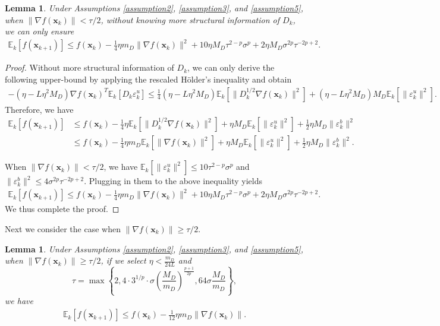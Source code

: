 \documentclass{article}
\newcommand{\bx}{\boldsymbol{x}}
\theoremstyle{plain}
\newtheorem{lemma}[theorem]{Lemma}
\theoremstyle{definition}
\theoremstyle{remark}
\begin{document}
\begin{lemma}
     Under Assumptions \ref{assumption2}, \ref{assumption3}, and \ref{assumption5}, when $\|\nabla f(\bx_k)\|<\tau/2$, without knowing more structural information of $D_k$, we can only ensure
    \begin{align*}
    \mathbb{E}_k[ f(\bx_{k+1}) ] \le f(\bx_k) - \frac{1}{4} \eta m_D \|\nabla f(\bx_k)\|^2 + 10 \eta M_D \tau^{2-p}\sigma^p + 2\eta M_D \sigma^{2p}\tau^{-2p+2}.
\end{align*}
\end{lemma}

\begin{proof}
    
Without more structural information of $D_k$, we can only derive the following upper-bound by applying the rescaled Hölder's inequality and obtain
\begin{align*}
     - (\eta - L \eta^2 M_D) \nabla f(\bx_k)^T \mathbb{E}_k[ D_k \varepsilon_k^u] \leq \frac{1}{4}(\eta - L \eta^2 M_D) \mathbb{E}_k[\|D_k^{1/2}\nabla f(\bx_k)\|^2]  + (\eta - L \eta^2 M_D) M_D \mathbb{E}_k[ \| \varepsilon_k^u\|^2].
\end{align*}
Therefore, we have
\begin{align*}
    \mathbb{E}_k[ f(\bx_{k+1}) ] & \le f(\bx_k) - \frac{1}{4} \eta \mathbb{E}_k[ \| D_k^{1/2}\nabla f(\bx_k)\|^2 ] + \eta M_D \mathbb{E}_k[ \| \varepsilon_k^u\|^2]  + \frac{1}{2}\eta M_D  \|\varepsilon_k^b\|^2\\
    & \le f(\bx_k) - \frac{1}{4} \eta m_D \mathbb{E}_k[ \| \nabla f(\bx_k)\|^2 ] + \eta M_D \mathbb{E}_k[ \| \varepsilon_k^u\|^2]  + \frac{1}{2}\eta M_D  \|\varepsilon_k^b\|^2 .
\end{align*}

When $\|\nabla f(\bx_k)\|<\tau/2$, we have $\mathbb{E}_k[ \| \varepsilon_k^u\|^2]\leq 10\tau^{2-p}\sigma^p$ and $ \|\varepsilon_k^b\|^2 \leq 4\sigma^{2p}\tau^{-2p+2}$. Plugging in them to the above inequality yields
\begin{align*}
    \mathbb{E}_k[ f(\bx_{k+1}) ] \le f(\bx_k) - \frac{1}{4} \eta m_D \|\nabla f(\bx_k)\|^2 + 10 \eta M_D \tau^{2-p}\sigma^p + 2\eta M_D \sigma^{2p}\tau^{-2p+2}.
\end{align*}
We thus complete the proof.
\end{proof}

Next we consider the case when $\|\nabla f(\bx_k)\|\geq \tau/2$.

\begin{lemma}
    Under Assumptions \ref{assumption2}, \ref{assumption3}, and \ref{assumption5}, when $\|\nabla f(\bx_k)\|\geq \tau/2$, if we select $\eta<\frac{m_D}{24L }$ and 
    \begin{equation*}
        \tau = \max\left\{2,  4\cdot 3^{1/p}\cdot \sigma\left(\frac{M_D}{m_D}\right)^{\frac{p+1}{2p}}, 64 \sigma \frac{M_D}{m_D} \right\},
    \end{equation*}
    we have
    \begin{align*}
    \mathbb{E}_k[ f(\bx_{k+1}) ] \le f(\bx_k) - \frac{1}{12} \eta m_D \|\nabla f(\bx_k)\|.
\end{align*}
\end{lemma}
\end{document}

